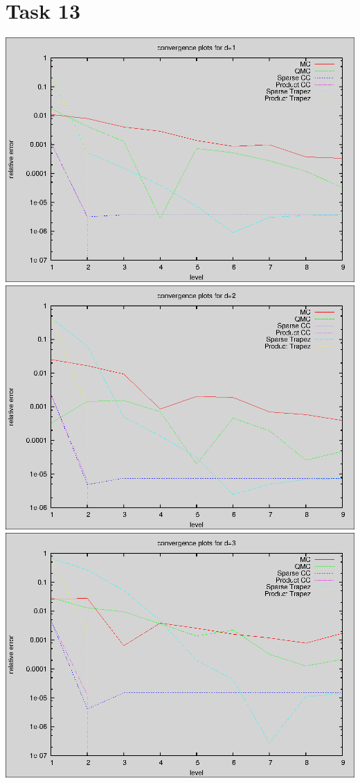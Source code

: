 \documentclass[]{article}
\begin{document}
\section*{Task 13}
\includegraphics{task13_d1}\\
\includegraphics{task13_d2}\\
\includegraphics{task13_d4}\\
\end{document}
